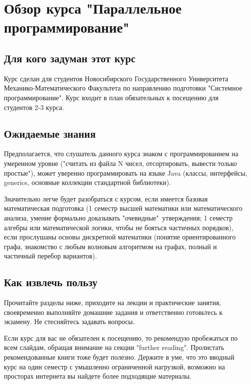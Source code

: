 \documentclass[a4paper, 12pt]{extarticle}
\title{}
\author{}
\date{}
\begin{document}
\section*{Обзор курса "Параллельное программирование"}

\subsection*{Для кого задуман этот курс}

Курс сделан для студентов Новосибирского Государственного Университета Механико-Математического Факультета по направлению подготовки "Системное программирование".
Курс входит в план обязательных к посещению для студентов 2-3 курса.

\subsection*{Ожидаемые знания}

Предполагается, что слушатель данного курса знаком с программированием на умеренном уровне ("считать из файла N чисел, отсортировать, вывести только простые"), может уверенно программировать на языке Java (классы, интерфейсы, generics, основные коллекции стандартной библиотеки).

Значительно легче будет разобраться с курсом, если имеется базовая математическая подготовка (1 семестр высшей математики или математического анализа, умение формально доказывать "очевидные"\ утверждения; 1 семестр алгебры или математической логики, чтобы не бояться частичных порядков), если прослушаны основы дискретной математики (понятие ориентированного графа, знакомство с любым волновым алгоритмом на графах, полный и частичный перебор вариантов).

\subsection*{Как извлечь пользу}

Прочитайте разделы ниже, приходите на лекции и практические занятия, своевременно выполняйте домашние задания и ответственно готовьтесь к экзамену. Не стесняйтесь задавать вопросы.

Если курс для вас не обязателен к посещению, то рекомендую пробежаться по всем слайдам, обращая внимание на секции "further reading". Пролистать рекомендованные книги тоже будет полезно. Держите в уме, что это вводный курс на один семестр с умышленно ограниченной нагрузкой, возможно на просторах интернета вы найдете более подходящие материалы.
\end{document}
